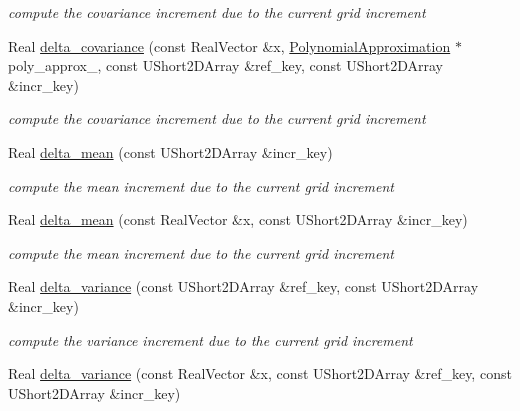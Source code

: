 \begin{DoxyCompactItemize}
\begin{DoxyCompactList}\small\item\em compute the covariance increment due to the current grid increment \end{DoxyCompactList}\item 
Real \hyperlink{classPecos_1_1HierarchInterpPolyApproximation_a931312a9e825efa5139f8110c2e48e7b}{delta\+\_\+covariance} (const Real\+Vector \&x, \hyperlink{classPecos_1_1PolynomialApproximation}{Polynomial\+Approximation} $\ast$poly\+\_\+approx\+\_, const U\+Short2\+D\+Array \&ref\+\_\+key, const U\+Short2\+D\+Array \&incr\+\_\+key)\label{classPecos_1_1HierarchInterpPolyApproximation_a931312a9e825efa5139f8110c2e48e7b}

\begin{DoxyCompactList}\small\item\em compute the covariance increment due to the current grid increment \end{DoxyCompactList}\item 
Real \hyperlink{classPecos_1_1HierarchInterpPolyApproximation_a2ad19ef780b2f6df0a0fa7c6e5354b87}{delta\+\_\+mean} (const U\+Short2\+D\+Array \&incr\+\_\+key)\label{classPecos_1_1HierarchInterpPolyApproximation_a2ad19ef780b2f6df0a0fa7c6e5354b87}

\begin{DoxyCompactList}\small\item\em compute the mean increment due to the current grid increment \end{DoxyCompactList}\item 
Real \hyperlink{classPecos_1_1HierarchInterpPolyApproximation_a4aa71b3572421587c1982eaf73829532}{delta\+\_\+mean} (const Real\+Vector \&x, const U\+Short2\+D\+Array \&incr\+\_\+key)\label{classPecos_1_1HierarchInterpPolyApproximation_a4aa71b3572421587c1982eaf73829532}

\begin{DoxyCompactList}\small\item\em compute the mean increment due to the current grid increment \end{DoxyCompactList}\item 
Real \hyperlink{classPecos_1_1HierarchInterpPolyApproximation_a9c557ad7598b71069d615266242487a5}{delta\+\_\+variance} (const U\+Short2\+D\+Array \&ref\+\_\+key, const U\+Short2\+D\+Array \&incr\+\_\+key)\label{classPecos_1_1HierarchInterpPolyApproximation_a9c557ad7598b71069d615266242487a5}

\begin{DoxyCompactList}\small\item\em compute the variance increment due to the current grid increment \end{DoxyCompactList}\item 
Real \hyperlink{classPecos_1_1HierarchInterpPolyApproximation_a80b3297ec61c03c246326cbcbc2fd4b0}{delta\+\_\+variance} (const Real\+Vector \&x, const U\+Short2\+D\+Array \&ref\+\_\+key, const U\+Short2\+D\+Array \&incr\+\_\+key)\label{classPecos_1_1HierarchInterpPolyApproximation_a80b3297ec61c03c246326cbcbc2fd4b0}


\end{DoxyCompactItemize}
